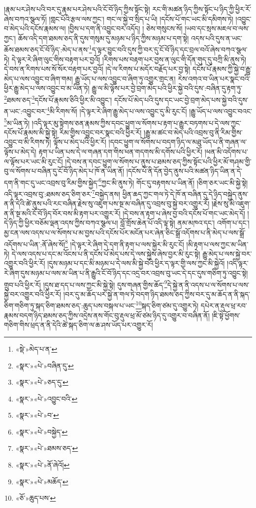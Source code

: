 །རྣམ་པར་ཤེས་པའི་བར་དུ་རྣམ་པར་ཤེས་པའི་ངོ་བོ་ཉིད་ཀྱིས་སྟོང་སྟེ། རང་གི་མཚན་ཉིད་ཀྱིས་སྟོང་པ་ཉིད་ཀྱི་ཕྱིར་རོ་ཞེས་བཀའ་སྩལ་ཏོ། །གླང་པོའི་རྩལ་ལས་ཀྱང་། གང་ལ་སྐྱེ་བ་སྲིད་པ་ཡི། །དངོས་པོ་གང་ཡང་མི་དམིགས་ཏེ། །འབྱུང་བ་མེད་པའི་དངོས་རྣམས་ལ། །བྱིས་པ་དག་ནི་འབྱུང་བར་འདོད། །
ཅེས་གསུངས་སོ། །ཡབ་དང་སྲས་མཇལ་བ་ལས་ཀྱང་། ཆོས་འདི་དག་ཐམས་ཅད་ནི་དུས་གསུམ་དུ་མཉམ་པ་ཉིད་ཀྱིས་མཉམ་པ་དག་སྟེ། འདས་པའི་དུས་ན་ཡང་ཆོས་ཐམས་ཅད་ངོ་བོ་ཉིད་:མེད་པ་ནས་\footnote{«སྡེ་»མེད་པ་ན་}ད་ལྟར་བྱུང་བའི་དུས་ཀྱི་བར་དུ་ངོ་བོ་ཉིད་དང་བྲལ་བའོ་ཞེས་བཀའ་སྩལ་ཏེ། དེ་ལྟར་རེ་ཞིག་ལུང་གིས་བརྟག་པར་བྱའོ། །རིགས་པས་བརྟག་པར་བྱས་ན་ལུང་གི་དོན་གུད་དུ་བཀྲི་མི་ནུས་ཏེ། དེ་བས་ན་རིགས་པས་སོ་སོར་བརྟག་པར་བྱའོ། །དེ་ལ་རིགས་པ་མདོར་བརྗོད་པར་བྱ་སྟེ། དངོས་པོ་རྣམས་ཀྱི་སྐྱེ་བ་རྒྱུ་མེད་པ་ལས་འབྱུང་བ་ཞིག་གམ། རྒྱུ་ཡོད་པ་ལས་འབྱུང་བ་ཞིག་ཏུ་འགྱུར་གྲང་ན། རེས་འགའ་བ་ཡིན་པར་སྣང་བའི་ཕྱིར་རྒྱུ་མེད་པ་ལས་འབྱུང་བ་མ་ཡིན་ཏེ། རྒྱུ་ལ་མི་ལྟོས་པར་བྱེ་བྲག་མེད་པའི་ཕྱིར་སྐྱེ་བའི་དུས་:བཞིན་དུ་རྟག་ཏུ་\footnote{«སྣར་»«པེ་»བཞིན་དུ་}ཐམས་ཅད་\footnote{«སྣར་»«པེ་»ཅད་དུ་}དངོས་པོ་རྣམས་ཅིའི་ཕྱིར་མི་འབྱུང་། དངོས་པོ་མེད་པའི་དུས་དང་ཡང་བྱེ་བྲག་མེད་པས་སྐྱེ་བའི་དུས་ན་ཡང་:འབྱུང་བར་\footnote{«སྣར་»«པེ་»འབྱུང་བའི་}མི་རིགས་སོ། །དེ་ལྟར་རེ་ཞིག་རྒྱུ་མེད་པ་ལས་འབྱུང་དུ་མི་རུང་ངོ། །རྒྱུ་ཡོད་པ་ལས་འབྱུང་བའང་\footnote{«སྣར་»«པེ་»བ་}མ་ཡིན་ཏེ། །འདི་ལྟར་མུ་སྟེགས་ཅན་རྣམས་ཀྱིས་དབང་ཕྱུག་ལ་སོགས་པ་རྟག་པ་རྒྱུར་བཏགས་པ་དེ་ལས་ཀྱང་དངོས་པོ་རྣམས་མི་སྐྱེ་སྟེ། རིམ་གྱིས་འབྱུང་བར་སྣང་བའི་ཕྱིར་རོ། །རྒྱུ་མ་ཚང་བ་མེད་པའི་འབྲས་བུ་ནི་རིམ་གྱིས་འབྱུང་བ་མི་རིགས་ཏེ། ལྟོས་པ་མེད་པའི་ཕྱིར་རོ། །དབང་ཕྱུག་ལ་སོགས་པ་བདག་ཉིད་ལ་མཐུ་ཡོད་པ་ནི་གཞན་ལ་ལྟོས་པ་མེད་དེ། རྟག་པ་ཡིན་པས་དེ་ལ་གཞན་དག་གིས་ཕན་གདགས་མི་དགོས་པའི་ཕྱིར་རོ། །ཕན་མི་འདོགས་པ་ལ་ལྟོས་པར་ཡང་མི་རུང་ངོ། །དེ་བས་ན་དབང་ཕྱུག་ལ་སོགས་པ་ནུས་པ་ཐམས་ཅད་ཀྱིས་སྟོང་པའི་ཕྱིར་མོ་གཤམ་གྱི་བུ་ལ་སོགས་པ་བཞིན་དུ་ངོ་བོ་ཉིད་མེད་པ་ཁོ་ན་ཡིན་ནོ། །དངོས་པོ་ནི་དོན་བྱེད་ནུས་པའི་མཚན་ཉིད་ཡིན་ན་དེ་དག་ནི་གང་དུ་ཡང་འབྲས་བུ་རིམ་གྱིས་སྐྱེད་\footnote{«སྣར་»«པེ་»བསྐྱེད་}ཀྱང་མི་ནུས་ཏེ། གོང་དུ་བརྟགས་པ་ཡིན་ནོ། །ཅིག་ཅར་ཡང་མི་སྐྱེ་སྟེ། འདི་ལྟར་འབྲས་བུ་:ཐམས་ཅད་ཅིག་ཅར་\footnote{«སྣར་»«པེ་»ཐམས་ཅད་}བསྐྱེད་ནས། ཕྱིན་ཆད་ཀྱང་གལ་ཏེ་དེ་ཁོ་ན་བཞིན་དུ་དེ་ཉིད་བསྐྱེད་ནུས་ན་ནི་དེའི་ཚེ་ནུས་པའི་རང་བཞིན་རྗེས་སུ་འཇུག་པས་སྔ་མ་བཞིན་དུ་འབྲས་བུ་སྐྱེ་བར་འགྱུར་རོ། །རྗེས་སུ་མི་འཇུག་ན་ནི་སྔ་མའི་ངོ་བོ་ཉིད་བོར་བས་མི་རྟག་པར་འགྱུར་རོ། །དེ་བས་ན་རྟག་པ་ཞེས་བྱ་བའི་དངོས་པོ་གང་ཡང་མེད་དོ། །དེ་ཉིད་ཀྱི་ཕྱིར་བཅོམ་ལྡན་འདས་ཀྱིས་བཀའ་སྩལ་པ། བློ་གྲོས་ཆེན་པོ་འདི་ལྟ་སྟེ། ནམ་མཁའ་དང་། འགོག་པ་དང་། མྱ་ངན་ལས་འདས་པ་ལ་སོགས་པ་མ་བྱས་པའི་དངོས་པོར་མངོན་པར་ཞེན་ཅིང་སྒྲོ་འདོགས་པ་ནི་མེད་པ་ལས་སྒྲོ་འདོགས་པ་ཡིན་:ནོ་ཞེས་སོ།\footnote{«སྣར་»«པེ་»ནོ་ཞེའོ།} །དེ་ལྟར་རེ་ཞིག་དེ་དག་ནི་རྟག་པ་ལས་སྐྱེར་མི་རུང་ངོ། །མི་རྟག་པ་ལས་ཀྱང་མ་ཡིན་ཏེ། དེ་ལས་འདས་པ་དང་མ་འོངས་པ་ནི་དངོས་པོ་མེད་པས་དེ་ལས་སྐྱེས་ཞེས་བྱར་མི་རུང་སྟེ། རྒྱུ་མེད་པ་ལས་སྐྱེ་བར་འགྱུར་བའི་ཕྱིར་རོ། །དུས་མཉམ་པ་དང་མི་མཉམ་པ་དེ་ལས་མི་སྐྱེ་བའི་ཕྱིར་ད་ལྟར་གྱི་ལས་ཀྱང་མི་སྐྱེའོ། །འདི་ལྟར་རེ་ཞིག་དུས་མཉམ་པ་ལས་མ་ཡིན་པ་ནི་རྒྱུའི་ངོ་བོ་ཉིད་དང་འདྲ་བར་འབྲས་བུ་ཡང་དེ་དང་དུས་གཅིག་ཏུ་འབྱུང་སྟེ། གྲུབ་པའི་ཕྱིར་རོ། །དུས་ཐ་དད་པ་ལས་ཀྱང་མི་སྐྱེ་སྟེ། དུས་གཞན་གྱིས་ཆོད་\footnote{«སྣར་»«པེ་»མཆོད་}དེ་སྐྱེ་ན་ནི་འདས་པ་ལ་སོགས་པ་ལས་སྐྱེ་བར་འགྱུར་བའི་ཕྱིར་རོ། །བར་དུ་མ་ཆོད་པར་སྐྱེ་ན་གལ་ཏེ་བདག་ཉིད་ཐམས་ཅད་ཀྱིས་བར་དུ་མ་ཆོད་ན་ནི་སྐད་ཅིག་གཅིག་ཏུ་སྐད་ཅིག་ཐམས་ཅད་:ཆུད་པས་བསྐལ་པ་ཡང་\footnote{«ཅོ་»ཆུད་པས་}སྐད་ཅིག་ཙམ་དུ་འགྱུར་ཏེ། དཔེར་ན་རྡུལ་ཕྲ་རབ་རྣམས་བདག་ཉིད་ཐམས་ཅད་ཀྱིས་འདྲེས་ནས་གོང་བུ་རྡུལ་ཕྲ་མོ་ཙམ་ཉིད་དུ་འགྱུར་བ་བཞིན་ནོ། །ཇི་སྟེ་ཕྱོགས་གཅིག་གིས་ཕྲད་ན་ནི་དེའི་ཚེ་སྐད་ཅིག་ལ་ཆ་ཤས་ཡོད་པར་འགྱུར་རོ། 